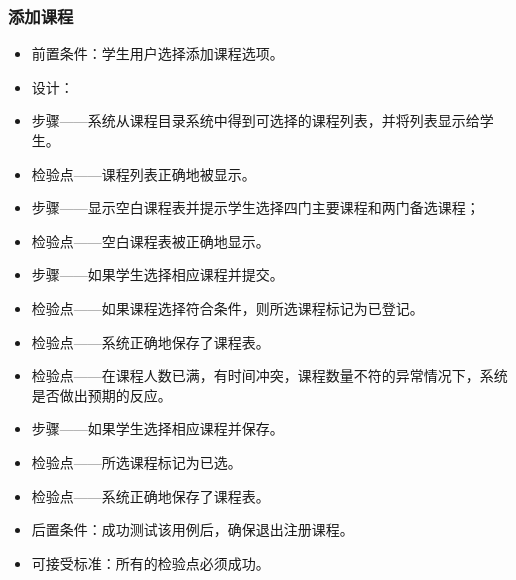 \subsubsection{添加课程}
  \begin{itemize}
    \item 前置条件：学生用户选择添加课程选项。
    \item 设计：
    \item 步骤——系统从课程目录系统中得到可选择的课程列表，并将列表显示给学生。
    \item 检验点——课程列表正确地被显示。
    \item 步骤——显示空白课程表并提示学生选择四门主要课程和两门备选课程；
    \item 检验点——空白课程表被正确地显示。
    \item 步骤——如果学生选择相应课程并提交。
    \item 检验点——如果课程选择符合条件，则所选课程标记为已登记。
    \item 检验点——系统正确地保存了课程表。
    \item 检验点——在课程人数已满，有时间冲突，课程数量不符的异常情况下，系统是否做出预期的反应。
    \item 步骤——如果学生选择相应课程并保存。
    \item 检验点——所选课程标记为已选。
    \item 检验点——系统正确地保存了课程表。
    \item 后置条件：成功测试该用例后，确保退出注册课程。
    \item 可接受标准：所有的检验点必须成功。
  \end{itemize}
